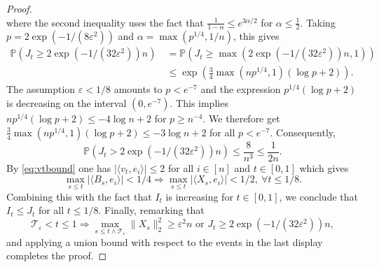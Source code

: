 \documentclass[12pt]{article}
\def \PP {\mathbb P}
\def \eps {\varepsilon}
\def \TTT {\mathcal{T}}
\theoremstyle{definition}
\theoremstyle{remark}
\begin{document}
\begin{proof}
$$$$
where the second inequality uses the fact that $\frac{1}{1-\alpha} \leq e^{3\alpha/2}$ for $\alpha \leq \tfrac{1}{2}$.
Taking $p=2\exp(-1/(8\eps^2))$ and $\alpha = \max(p^{1/4}, 1/n)$, this gives
\begin{align*}
\PP(J_t \geq 2 \exp(-1 / (32 \eps^2)) n) ~& = \PP \left (J_t \geq \max\left  (2 \exp(-1 / (32 \eps^2)) n,1 \right ) \right ) \\
& \leq \exp \left (  \tfrac{3}{4} \max(n p^{1/4}, 1)  \left ( \log p + 2 \right )\right ).
\end{align*}
The assumption $\eps < 1/8$ amounts to $p < e^{-7}$ and the expression $p^{1/4} (\log p + 2)$ is decreasing on the interval $(0,e^{-7})$. This implies $n p^{1/4} (\log p + 2) \leq - 4 \log n + 2$ for $p \geq n^{-4}$. We therefore get $\frac{3}{4} \max(n p^{1/4}, 1)\left (\log p + 2 \right ) \leq - 3 \log n + 2$ for all $p < e^{-7}$. Consequently,
$$
\PP(J_t > 2 \exp(-1 / (32 \eps^2)) n) \leq \frac{8}{n^3} \leq \frac{1}{2n}.
$$
By \eqref{eq:vtbound} one has $|\langle v_t, e_i \rangle| \leq 2$ for all $i \in [n]$ and $t \in [0,1]$ which gives
$$
\max_{s \leq t} |\langle B_s, e_i \rangle| < 1/4 \Rightarrow \max_{s \leq t} |\langle X_s, e_i \rangle| < 1/2, ~ \forall t \leq 1/8.
$$
Combining this with the fact that $I_t$ is increasing for $t \in [0,1]$, we conclude that $I_t \leq J_t$ for all $t \leq 1/8$. Finally, remarking that
$$
\TTT_\eps < t \leq 1 \Rightarrow  \max_{s \leq t \wedge \TTT_\eps } \| X_s\|_2^2 \geq \eps^2 n \mbox{ or } J_t \geq 2 \exp(-1 / (32 \eps^2)) n,
$$
and applying a union bound with respect to the events in the last display completes the proof.
\end{proof}
\end{document}
